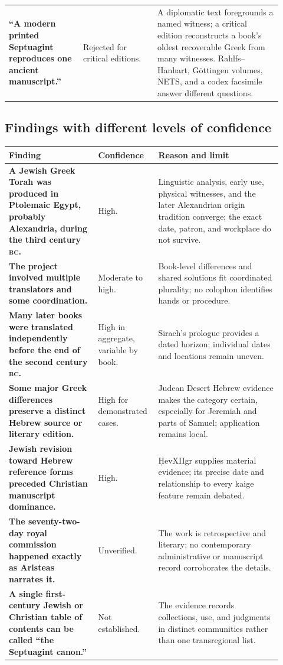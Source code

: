 \begin{longtable}{>{\bfseries\RaggedRight\arraybackslash}p{0.25\linewidth}>{\RaggedRight\arraybackslash}p{0.25\linewidth}>{\RaggedRight\arraybackslash}p{0.42\linewidth}}
“A modern printed Septuagint reproduces one ancient manuscript.” & Rejected for critical editions. & A diplomatic text foregrounds a named witness; a critical edition reconstructs a book's oldest recoverable Greek from many witnesses. Rahlfs--Hanhart, G\"ottingen volumes, NETS, and a codex facsimile answer different questions.\\
\end{longtable}

\subsection{Findings with different levels of confidence}

\begin{longtable}{>{\bfseries\RaggedRight\arraybackslash}p{0.31\linewidth}>{\RaggedRight\arraybackslash}p{0.18\linewidth}>{\RaggedRight\arraybackslash}p{0.43\linewidth}}
\toprule
\textbf{Finding} & \textbf{Confidence} & \textbf{Reason and limit}\\
\midrule
\endhead
A Jewish Greek Torah was produced in Ptolemaic Egypt, probably Alexandria, during the third century \textnormal{\textsc{bc}}. & High. & Linguistic analysis, early use, physical witnesses, and the later Alexandrian origin tradition converge; the exact date, patron, and workplace do not survive.\\
The project involved multiple translators and some coordination. & Moderate to high. & Book-level differences and shared solutions fit coordinated plurality; no colophon identifies hands or procedure.\\
Many later books were translated independently before the end of the second century \textnormal{\textsc{bc}}. & High in aggregate, variable by book. & Sirach's prologue provides a dated horizon; individual dates and locations remain uneven.\\
Some major Greek differences preserve a distinct Hebrew source or literary edition. & High for demonstrated cases. & Judean Desert Hebrew evidence makes the category certain, especially for Jeremiah and parts of Samuel; application remains local.\\
Jewish revision toward Hebrew reference forms preceded Christian manuscript dominance. & High. & 8\d{H}evXIIgr supplies material evidence; its precise date and relationship to every kaige feature remain debated.\\
The seventy-two-day royal commission happened exactly as Aristeas narrates it. & Unverified. & The work is retrospective and literary; no contemporary administrative or manuscript record corroborates the details.\\
A single first-century Jewish or Christian table of contents can be called “the Septuagint canon.” & Not established. & The evidence records collections, use, and judgments in distinct communities rather than one transregional list.\\
\bottomrule
\end{longtable}


